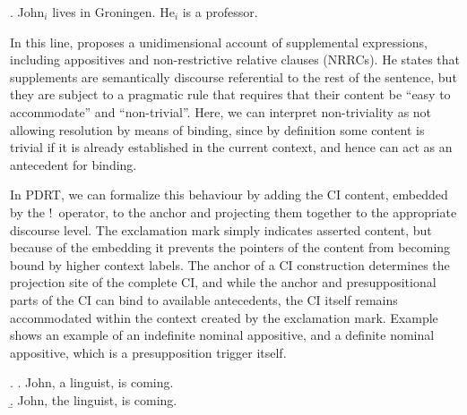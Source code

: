 \ex. John$_i$ lives in Groningen. He$_i$ is a professor.

In this line, \citet{schlenker2013supplements} proposes a unidimensional
account of supplemental expressions, including appositives and
non-restrictive relative clauses (NRRCs).  He states that supplements are
semantically discourse referential to the rest of the sentence, but they are
subject to a pragmatic rule that requires that their content be ``easy to
accommodate'' and ``non-trivial''. 
Here, we can interpret non-triviality as
not allowing resolution by means of binding, since by definition some
content is trivial if it is already established in the current context, and
hence can act as an antecedent for binding.

In PDRT, we can formalize this behaviour by adding the CI content, embedded
by the $!$~operator, to the anchor and projecting them together to the
appropriate discourse level.  The exclamation mark simply indicates
asserted content, but because of the embedding it prevents the pointers of
the content from becoming bound by higher context labels.  The anchor of
a CI construction determines the projection site of the complete CI, and
while the anchor and presuppositional parts of the CI can bind to available
antecedents, the CI itself remains accommodated within the context created
by the exclamation mark. Example \Next shows an example of an indefinite
nominal appositive, and a definite nominal appositive, which is
a presupposition trigger itself.

\begin{flushleft}
\begin{minipage}{\linewidth}
\begin{multicols}{2}
  \ex. \a.\hspace*{-0.2cm} John, a linguist, is coming.\\
\columnbreak
\b.\hspace*{-0.2cm} John, the linguist, is coming.\\

\end{multicols}
\end{minipage}
\end{flushleft}

